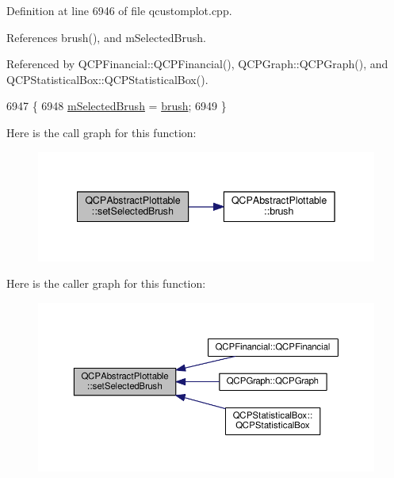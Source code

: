 Definition at line 6946 of file qcustomplot.\+cpp.



References brush(), and m\+Selected\+Brush.



Referenced by Q\+C\+P\+Financial\+::\+Q\+C\+P\+Financial(), Q\+C\+P\+Graph\+::\+Q\+C\+P\+Graph(), and Q\+C\+P\+Statistical\+Box\+::\+Q\+C\+P\+Statistical\+Box().


\begin{DoxyCode}
6947 \{
6948   \hyperlink{class_q_c_p_abstract_plottable_aea3c0da30c7a8be23ad5f2d9bca36762}{mSelectedBrush} = \hyperlink{class_q_c_p_abstract_plottable_aa74cdceb9c7286ef116fbfa58e0326e7}{brush};
6949 \}
\end{DoxyCode}


Here is the call graph for this function\+:\nopagebreak
\begin{figure}[H]
\begin{center}
\leavevmode
\includegraphics[width=342pt]{class_q_c_p_abstract_plottable_ae8c816874089f7a44001e8618e81a9dc_cgraph}
\end{center}
\end{figure}




Here is the caller graph for this function\+:\nopagebreak
\begin{figure}[H]
\begin{center}
\leavevmode
\includegraphics[width=350pt]{class_q_c_p_abstract_plottable_ae8c816874089f7a44001e8618e81a9dc_icgraph}
\end{center}
\end{figure}


